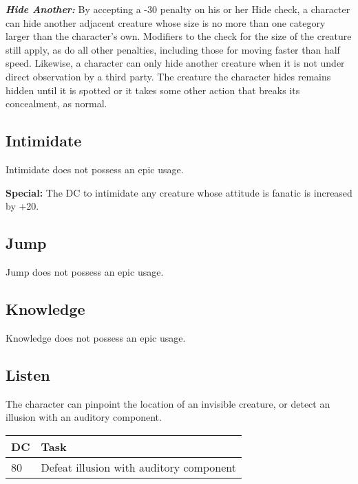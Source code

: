 \documentclass{article}
\begin{document}
\textit{\textbf{Hide Another:}}\textit{ }By accepting a -30 penalty on his or her 
Hide check, a character can hide another adjacent creature whose size is no more 
than one category larger than the character's own. Modifiers to the check for the 
size of the creature still apply, as do all other penalties, including those for 
moving faster than half speed. Likewise, a character can only hide another creature 
when it is not under direct observation by a third party. The creature the character 
hides remains hidden until it is spotted or it takes some other action that breaks 
its concealment, as normal. 

\vspace{12pt}
\subsection*{Intimidate }

Intimidate does not possess an epic usage. 

\textbf{Special:} The DC to intimidate any creature whose attitude is fanatic is 
increased by +20. 

\vspace{12pt}
\subsection*{Jump }

Jump does not possess an epic usage. 

\vspace{12pt}
\subsection*{Knowledge}

Knowledge does not possess an epic usage. 

\vspace{12pt}
\subsection*{Listen }

The character can pinpoint the location of an invisible creature, or detect an 
illusion with an auditory component. 

\begin{tabular}{|>{\raggedright}p{13pt}|>{\raggedright}p{161pt}|}
\hline
D\textbf{C } & T\textbf{ask }\tabularnewline
\hline
80  & Defeat illusion with auditory component \tabularnewline
\hline
\end{tabular}
\end{document}

